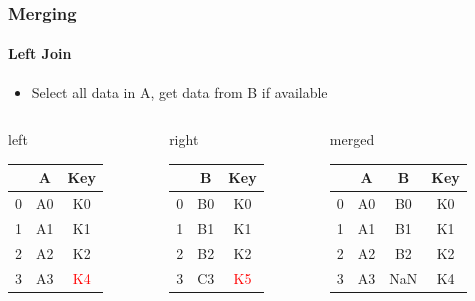 \documentclass[ngerman]{beamer}
\def\firstcircle{(0,0) circle (2cm)}
\def\secondcircle{(0:3cm) circle (2cm)}
\begin{document}
\begin{frame}
\frametitle{Merging}
\framesubtitle{Left Join}

\begin{itemize}
\item Select all data in A, get data from B if available
\end{itemize}

\begin{center}
\end{center}

{\footnotesize
\begin{columns}
\begin{column}{0.3\textwidth}
left \\
\begin{tabular}{c|cc} \toprule
   & A  &  Key \\ \midrule
0 & A0 &  K0 \\
1 & A1 &  K1 \\ 
2 & A2 &  K2 \\
3 & A3 &  \textcolor{red}{K4} \\ \bottomrule
\end{tabular}
\end{column}
\begin{column}{0.3\textwidth}
right \\
\begin{tabular}{c|cc} \toprule
   &  B   & Key \\ \midrule
0 &  B0 & K0 \\
1 &  B1 & K1 \\ 
2 &  B2 & K2 \\
3 &  C3 & \textcolor{red}{K5} \\ \bottomrule
\end{tabular}\end{column}
\begin{column}{0.3\textwidth}
merged \\
\begin{tabular}{c|ccc} \toprule
   & A  & B   & Key \\ \midrule
0 & A0 & B0 & K0 \\
1 & A1 & B1 & K1 \\ 
2 & A2 & B2 & K2 \\ \bottomrule
3 & A3 & NaN & K4 \\ \bottomrule
\end{tabular} \\
\vspace*{0.4em}
\end{column}
\end{columns}}

\end{frame}
\end{document}
